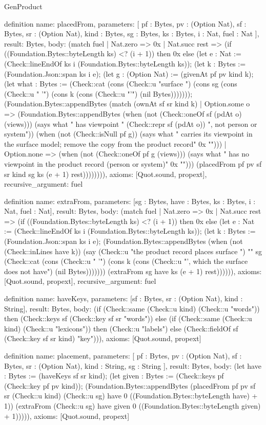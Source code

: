 \begin{lexlean}{GenProduct}
\begin{semanticmodule}
{definition{
  name: placedFrom,
  parameters: [
    pf : Bytes,
    pv : (Option Nat),
    sf : Bytes,
    sr : (Option Nat),
    kind : Bytes,
    sg : Bytes,
    ks : Bytes,
    i : Nat,
    fuel : Nat
  ],
  result: Bytes,
  body: (match fuel
    | Nat.zero => 0x
    | Nat.succ rest => (if ((Foundation.Bytes::byteLength ks) <? (i + 1)) then 0x else (let e : Nat := (Check::lineEndOf ks i (Foundation.Bytes::byteLength ks)); (let k : Bytes := (Foundation.Json::span ks i e); (let g : (Option Nat) := (givenAt pf pv kind k); (let what : Bytes := (Check::cat (cons (Check::u "surface ") (cons sg (cons (Check::u " '") (cons k (cons (Check::u "'") (nil Bytes))))))); (Foundation.Bytes::appendBytes (match (ownAt sf sr kind k)
      | Option.some o => (Foundation.Bytes::appendBytes (when (not (Check::oneOf sf (pdAt o) (views))) (says what " has viewpoint " (Check::repr sf (pdAt o)) ", not person or system")) (when (not (Check::isNull pf g)) (says what " carries its viewpoint in the surface model; remove the copy from the product record" 0x "")))
      | Option.none => (when (not (Check::oneOf pf g (views))) (says what " has no viewpoint in the product record (person or system)" 0x ""))) (placedFrom pf pv sf sr kind sg ks (e + 1) rest)))))))),
  axioms: [Quot.sound, propext],
  recursive_argument: fuel
}

definition{
  name: extraFrom,
  parameters: [sg : Bytes, have : Bytes, ks : Bytes, i : Nat, fuel : Nat],
  result: Bytes,
  body: (match fuel
    | Nat.zero => 0x
    | Nat.succ rest => (if ((Foundation.Bytes::byteLength ks) <? (i + 1)) then 0x else (let e : Nat := (Check::lineEndOf ks i (Foundation.Bytes::byteLength ks)); (let k : Bytes := (Foundation.Json::span ks i e); (Foundation.Bytes::appendBytes (when (not (Check::inLines have k)) (say (Check::u "the product record places surface ") "" sg (Check::cat (cons (Check::u " '") (cons k (cons (Check::u "', which the surface does not have") (nil Bytes))))))) (extraFrom sg have ks (e + 1) rest)))))),
  axioms: [Quot.sound, propext],
  recursive_argument: fuel
}

definition{
  name: haveKeys,
  parameters: [sf : Bytes, sr : (Option Nat), kind : String],
  result: Bytes,
  body: (if (Check::same (Check::u kind) (Check::u "words")) then (Check::keys sf (Check::key sf sr "words")) else (if (Check::same (Check::u kind) (Check::u "lexicons")) then (Check::u "labels\nroles\n") else (Check::fieldOf sf (Check::key sf sr kind) "key"))),
  axioms: [Quot.sound, propext]
}

definition{
  name: placement,
  parameters: [
    pf : Bytes,
    pv : (Option Nat),
    sf : Bytes,
    sr : (Option Nat),
    kind : String,
    sg : String
  ],
  result: Bytes,
  body: (let have : Bytes := (haveKeys sf sr kind); (let given : Bytes := (Check::keys pf (Check::key pf pv kind)); (Foundation.Bytes::appendBytes (placedFrom pf pv sf sr (Check::u kind) (Check::u sg) have 0 ((Foundation.Bytes::byteLength have) + 1)) (extraFrom (Check::u sg) have given 0 ((Foundation.Bytes::byteLength given) + 1))))),
  axioms: [Quot.sound, propext]
}

}
\end{semanticmodule}
\end{lexlean}
